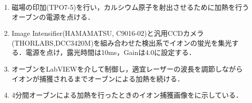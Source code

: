 \begin{enumerate}
\begin{enumerate}
\item 磁場の印加(TPO7-5)を行い，カルシウム原子を射出させるために加熱を行うオーブンの電源を点ける．

\item Image Intensifier(HAMAMATSU,
 C9016-02)と汎用CCDカメラ(THORLABS,DCC3420M)を組み合わせた検出系でイオンの蛍光を集光する．電源を点け，露光時間は10ms，Gainは4.0に設定する．
 
\item オーブンをLabVIEWを介して制御し，適宜レーザーの波長を調節しながらイオンが捕獲されるまでオーブンによる加熱を続ける．

\item 4分間オーブンによる加熱を行ったときのイオン捕獲画像をに示している．
\end{enumerate}
\end{enumerate}
%
\clearpage
%
